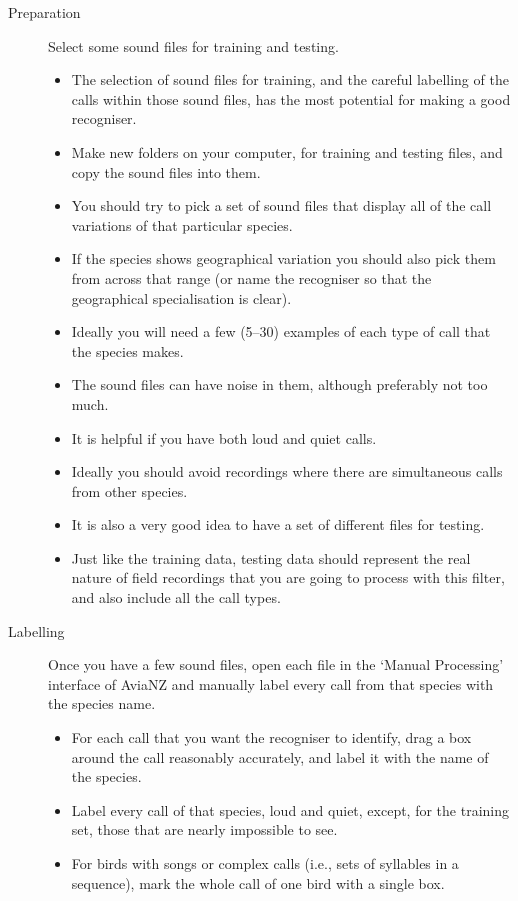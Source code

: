 \documentclass{article}
\begin{document}
\begin{description}
\item[Preparation] Select some sound files for training and testing. 
\begin{itemize}
\item The selection of sound files for training, and the careful labelling of the calls within those sound files, has the most potential for making a good recogniser. 
\item Make new folders on your computer, for training and testing files, and copy the sound files into them.
\item You should try to pick a set of sound files that display all of the call variations of that particular species. 
\item If the species shows geographical variation you should also pick them from across that range (or name the recogniser so that the geographical specialisation is clear).  
\item Ideally you will need a few (5--30) examples of each type of call that the species makes. 
\item The sound files can have noise in them, although preferably not too much. 
\item It is helpful if you have both loud and quiet calls. 
\item Ideally you should avoid recordings where there are simultaneous calls from other species.
\item It is also a very good idea to have a set of different files for testing.
\item Just like the training data, testing data should represent the real nature of field recordings that you are going to process with this filter, and also include all the call types.
\end{itemize}
\item[Labelling] Once you have a few sound files, open each file in the `Manual Processing' interface of AviaNZ and manually label every call from that species with the species name.
\begin{itemize}
\item For each call that you want the recogniser to identify, drag a box around the call reasonably accurately, and label it with the name of the species.
\item Label every call of that species, loud and quiet, except, for the training set, those that are nearly impossible to see.
\item For birds with songs or complex calls (i.e., sets of syllables in a sequence), mark the whole call of one bird with a single box. 

\end{itemize}
\end{description}
\end{document}

